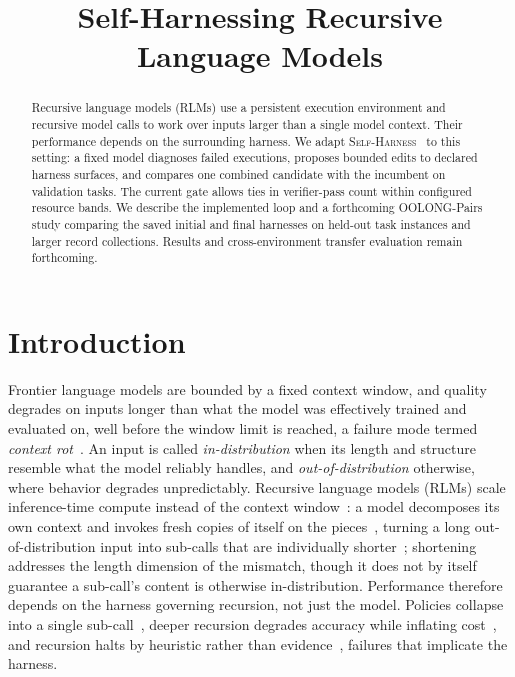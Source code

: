 \documentclass{article}
\title{Self-Harnessing Recursive Language Models}
\newcommand{\rlms}{\textsc{RLM}s\xspace}
\newcommand{\sh}{\textsc{Self-Harness}\xspace}
\begin{document}
\maketitle

\begin{abstract}
Recursive language models (\rlms) use a persistent execution environment and
recursive model calls to work over inputs larger than a single model context.
Their performance depends on the surrounding harness. We adapt
\sh{}~\citep{zhang2026selfharness} to this setting: a fixed model diagnoses failed
executions, proposes bounded edits to declared harness surfaces, and compares
one combined candidate with the incumbent on validation tasks. The current gate
allows ties in verifier-pass count within configured resource bands. We describe
the implemented loop and a forthcoming OOLONG-Pairs study comparing the saved
initial and final harnesses on held-out task instances and larger record
collections. Results and cross-environment transfer evaluation remain forthcoming.
\end{abstract}

\section{Introduction}
Frontier language models are bounded by a fixed context window, and quality degrades on
inputs longer than what the model was effectively trained and evaluated on, well before the
window limit is reached, a failure mode termed \emph{context rot}~\citep{hong2025contextrot}.
An input is called \emph{in-distribution} when its length and structure resemble what the model reliably handles, and \emph{out-of-distribution} otherwise, where behavior degrades unpredictably. Recursive language models (\rlms) scale inference-time compute instead of the
context window~\citep{snell2024scaling}: a model decomposes its own context and invokes fresh
copies of itself on the pieces~\citep{zhang2025rlm}, turning a long out-of-distribution input
into sub-calls that are individually shorter~\citep{zhang2026harness}; shortening addresses
the length dimension of the mismatch, though it does not by itself guarantee a sub-call's
content is otherwise in-distribution.
Performance therefore depends on the harness governing recursion, not just the model.
Policies collapse into a single sub-call~\citep{zhang2026harness},
deeper recursion degrades accuracy while inflating cost~\citep{wang2026overthink}, and recursion
halts by heuristic rather than evidence~\citep{guha2026termination}, failures that implicate
the harness.
\end{document}
